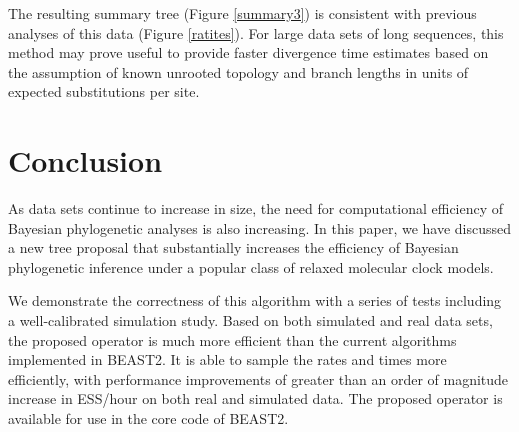\documentclass{bmcart}
\begin{document}
The resulting summary tree (Figure \ref{summary3}) is consistent with previous analyses of this data \cite{cooper2001complete} (Figure \ref{ratites}). For large data sets of long sequences, this method may prove useful to provide faster divergence time estimates based on the assumption of known unrooted topology and branch lengths in units of expected substitutions per site.



\section*{Conclusion}
As data sets continue to increase in size, the need for computational efficiency of Bayesian phylogenetic analyses is also increasing. In this paper, we have discussed a new tree proposal that substantially increases the efficiency of Bayesian phylogenetic inference under a popular class of relaxed molecular clock models.

We demonstrate the correctness of this algorithm with a series of tests including a well-calibrated simulation study. Based on both simulated and real data sets, the proposed operator is much more efficient than the current algorithms implemented in BEAST2. It is able to sample the rates and times more efficiently, with performance improvements of greater than an order of magnitude increase in ESS/hour on both real and simulated data. The proposed operator is available for use in the core code of BEAST2.
\end{document}
